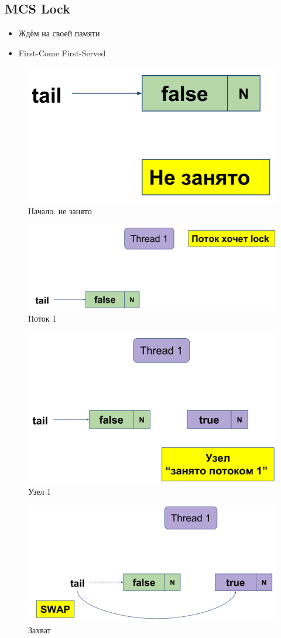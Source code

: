 \documentclass[10pt,a4paper,oneside,titlepage]{article}
\theoremstyle{plain}
\theoremstyle{defenition}
\begin{document}
\subsection{MCS Lock}

\begin{itemize}
	\item Ждём на своей памяти
	\item First-Come First-Served
\end{itemize}

\begin{figure}[h!]
	\centering
	\includegraphics[width=0.4\linewidth]{pictures/MCS1}
	\caption{Начало: не занято}
	\label{fig:mcs1}
\end{figure}

\begin{figure}[h!]
	\centering
	\includegraphics[width=0.4\linewidth]{pictures/MCS2}
	\caption{Поток 1}
	\label{fig:mcs2}
\end{figure}

\begin{figure}[h!]
	\centering
	\includegraphics[width=0.4\linewidth]{pictures/MCS3}
	\caption{Узел 1}
	\label{fig:mcs3}
\end{figure}

\begin{figure}[h!]
	\centering
	\includegraphics[width=0.4\linewidth]{pictures/MCS4}
	\caption{Захват}
	\label{fig:mcs4}
\end{figure}
\end{document}
